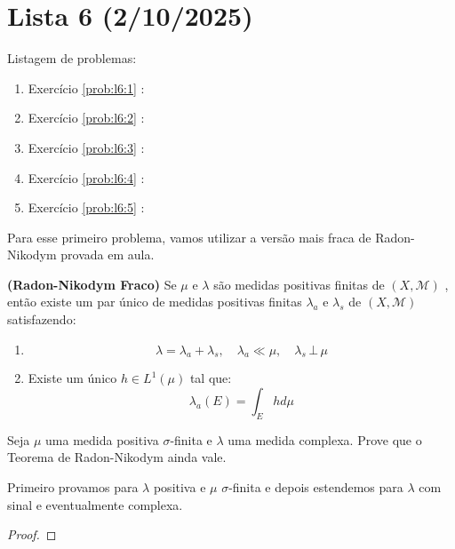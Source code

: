 \section{Lista 6 (2/10/2025)}


Listagem de problemas:
\begin{enumerate}
    \item Exercício \ref{prob:l6:1} : \Frowny
    \item Exercício \ref{prob:l6:2} : \checkmark
    \item Exercício \ref{prob:l6:3} : \Frowny
    \item Exercício \ref{prob:l6:4} : \Frowny
    \item Exercício \ref{prob:l6:5} : \checkmark
\end{enumerate}


Para esse primeiro problema, vamos utilizar a versão mais fraca de Radon-Nikodym provada em aula.
\begin{theorem}
    \label{trm:weak_radon}
    \textbf{(Radon-Nikodym Fraco)} Se $\mu$ e $\lambda$ são medidas positivas finitas de $(X, \mathcal{M})$ , então existe um par 
    único de medidas positivas finitas $\lambda_a$ e $\lambda_s$ de $(X, \mathcal{M})$ satisfazendo:
    \begin{enumerate}[label=(\alph*)]
        \item \begin{equation}
            \lambda = \lambda_a + \lambda_s, \quad \lambda_a  \ll \mu, \quad \lambda_s\,\bot\,\mu
        \end{equation}
        \item Existe um único $h \in L^1(\mu)$ tal que:
        \begin{equation}
            \lambda_a(E) = \int_E h d\mu
        \end{equation}
    \end{enumerate}
\end{theorem}


\begin{problem}
    \label{prob:l6:1}
    Seja $\mu$ uma medida positiva $\sigma$-finita e $\lambda$ uma medida complexa. Prove que o Teorema de Radon-Nikodym ainda vale.
\end{problem}
    Primeiro provamos para $\lambda$ positiva e $\mu$ $\sigma$-finita e depois estendemos para $\lambda$ com sinal e eventualmente complexa.
\begin{proof}
    
\end{proof}

